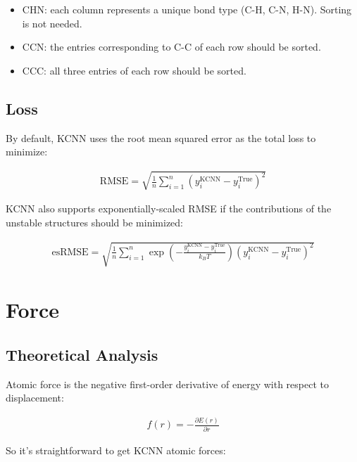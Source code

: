 \documentclass{article}
\begin{document}
\begin{itemize}
	\item CHN: each column represents a unique bond type (C-H, C-N, H-N). Sorting is not needed.
	\item CCN: the entries corresponding to C-C of each row should be sorted.
	\item CCC: all three entries of each row should be sorted.
\end{itemize}

\subsection{Loss}

By default, KCNN uses the root mean squared error as the total loss to minimize:

\begin{eqnarray}
\mathrm{RMSE} = \sqrt{
	\frac{1}{n}
	\sum_{i=1}^{n}{ 
		\left( y_{i}^{\mathrm{KCNN}} - y_{i}^{\mathrm{True}} \right)^2
	}
}	
\end{eqnarray}

KCNN also supports exponentially-scaled RMSE if the contributions of the unstable structures 
should be minimized:

\begin{eqnarray}
\mathrm{esRMSE} = \sqrt{
	\frac{1}{n} 
	\sum_{i=1}^{n}{
		\exp{\left(-\frac{y_{i}^{\mathrm{KCNN}} - y_{i}^{\mathrm{True}}}{k_BT} \right)}
		\left(y_{i}^{\mathrm{KCNN}} - y_{i}^{\mathrm{True}} \right)^2
	}
}	
\end{eqnarray}

\section{Force}

\subsection{Theoretical Analysis}

Atomic force is the negative first-order derivative of energy with respect to 
displacement:

\begin{eqnarray}
f(r) = -\frac{\partial E(r)}{\partial r}
\end{eqnarray}

\noindent So it's straightforward to get KCNN atomic forces:
\end{document}
